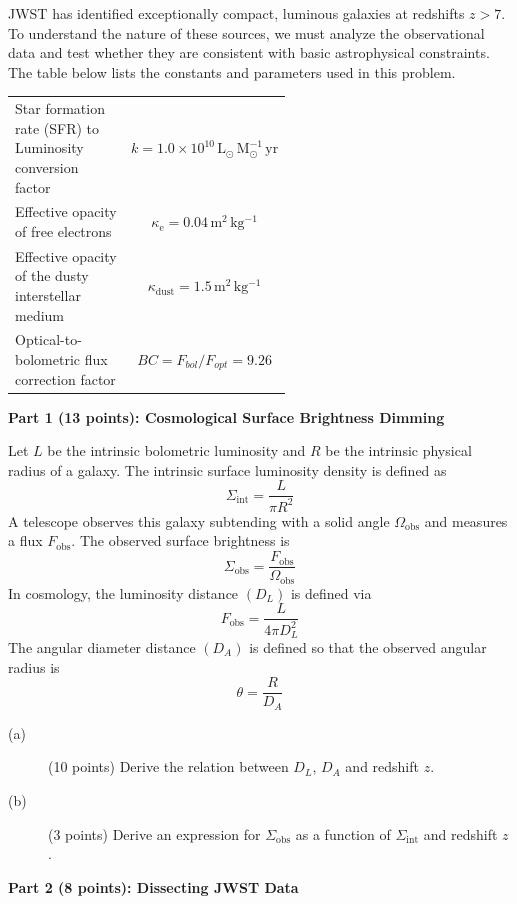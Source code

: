 JWST has identified exceptionally compact, luminous galaxies at redshifts
$z > 7$. To understand the nature of these sources, we must analyze the
observational data and test whether they are consistent with basic
astrophysical constraints. The table below lists the constants and parameters
used in this problem.

\begin{center}
\begin{tabular}{p{0.55\linewidth}c}
\toprule
Star formation rate (SFR) to Luminosity conversion factor &
  $k = 1.0 \times 10^{10}\,\mathrm{L_\odot\,M_\odot^{-1}\,yr}$ \\
Effective opacity of free electrons &
  $\kappa_{\mathrm{e}} = 0.04\,\mathrm{m^2\,kg^{-1}}$ \\
Effective opacity of the dusty interstellar medium &
  $\kappa_{\mathrm{dust}} = 1.5\,\mathrm{m^2\,kg^{-1}}$ \\
Optical-to-bolometric flux correction factor &
  $BC = F_{bol}/F_{opt} = 9.26$ \\
\bottomrule
\end{tabular}
\end{center}

\medskip\noindent\textbf{Part 1 (13 points): Cosmological Surface Brightness Dimming}

Let $L$ be the intrinsic bolometric luminosity and $R$ be the intrinsic
physical radius of a galaxy. The intrinsic surface luminosity density is
defined as
\[ \Sigma_{\mathrm{int}} = \frac{L}{\pi R^2} \]
A telescope observes this galaxy subtending with a solid angle
$\Omega_{\mathrm{obs}}$ and measures a flux $F_{\mathrm{obs}}$. The observed
surface brightness is
\[ \Sigma_{\mathrm{obs}} = \frac{F_{\mathrm{obs}}}{\Omega_{\mathrm{obs}}} \]
In cosmology, the luminosity distance $(D_L)$ is defined via
\[ F_{\mathrm{obs}} = \frac{L}{4\pi D_L^2} \]
The angular diameter distance $(D_A)$ is defined so that the observed angular
radius is
\[ \theta = \frac{R}{D_A} \]

\begin{description}
\item[(a)] (10 points) Derive the relation between $D_L$, $D_A$ and redshift
  $z$.
\item[(b)] (3 points) Derive an expression for $\Sigma_{\mathrm{obs}}$ as a
  function of $\Sigma_{\mathrm{int}}$ and redshift $z$.
\end{description}

\medskip\noindent\textbf{Part 2 (8 points): Dissecting JWST Data}

